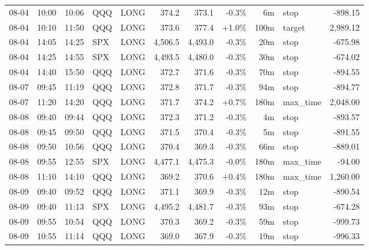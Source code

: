\documentclass[11pt,a4paper,twoside]{article}
\begin{document}
\begin{center}
\begin{longtable}{>{\color{txtmain}}l l l l l r r r r >{\color{txtmain}}l r}
08-04 & 10:00 & 10:06 & QQQ & LONG & 374.2 & 373.1 & \textcolor{lossred}{-0.3\%} & 6m & stop & \textcolor{lossred}{-898.15} \\
08-04 & 10:10 & 11:50 & QQQ & LONG & 373.6 & 377.4 & \textcolor{wingreen}{+1.0\%} & 100m & target & \textcolor{wingreen}{2,989.12} \\
08-04 & 14:05 & 14:25 & SPX & LONG & 4,506.5 & 4,493.0 & \textcolor{lossred}{-0.3\%} & 20m & stop & \textcolor{lossred}{-675.98} \\
08-04 & 14:25 & 14:55 & SPX & LONG & 4,493.5 & 4,480.0 & \textcolor{lossred}{-0.3\%} & 30m & stop & \textcolor{lossred}{-674.02} \\
08-04 & 14:40 & 15:50 & QQQ & LONG & 372.7 & 371.6 & \textcolor{lossred}{-0.3\%} & 70m & stop & \textcolor{lossred}{-894.55} \\
08-07 & 09:45 & 11:19 & QQQ & LONG & 372.8 & 371.7 & \textcolor{lossred}{-0.3\%} & 94m & stop & \textcolor{lossred}{-894.77} \\
08-07 & 11:20 & 14:20 & QQQ & LONG & 371.7 & 374.2 & \textcolor{wingreen}{+0.7\%} & 180m & max\_time & \textcolor{wingreen}{2,048.00} \\
08-08 & 09:40 & 09:44 & QQQ & LONG & 372.3 & 371.2 & \textcolor{lossred}{-0.3\%} & 4m & stop & \textcolor{lossred}{-893.57} \\
08-08 & 09:45 & 09:50 & QQQ & LONG & 371.5 & 370.4 & \textcolor{lossred}{-0.3\%} & 5m & stop & \textcolor{lossred}{-891.55} \\
08-08 & 09:50 & 10:56 & QQQ & LONG & 370.4 & 369.3 & \textcolor{lossred}{-0.3\%} & 66m & stop & \textcolor{lossred}{-889.01} \\
08-08 & 09:55 & 12:55 & SPX & LONG & 4,477.1 & 4,475.3 & \textcolor{lossred}{-0.0\%} & 180m & max\_time & \textcolor{lossred}{-94.00} \\
08-08 & 11:10 & 14:10 & QQQ & LONG & 369.2 & 370.6 & \textcolor{wingreen}{+0.4\%} & 180m & max\_time & \textcolor{wingreen}{1,260.00} \\
08-09 & 09:40 & 09:52 & QQQ & LONG & 371.1 & 369.9 & \textcolor{lossred}{-0.3\%} & 12m & stop & \textcolor{lossred}{-890.54} \\
08-09 & 09:40 & 11:13 & SPX & LONG & 4,495.2 & 4,481.7 & \textcolor{lossred}{-0.3\%} & 93m & stop & \textcolor{lossred}{-674.28} \\
08-09 & 09:55 & 10:54 & QQQ & LONG & 370.3 & 369.2 & \textcolor{lossred}{-0.3\%} & 59m & stop & \textcolor{lossred}{-999.73} \\
08-09 & 10:55 & 11:14 & QQQ & LONG & 369.0 & 367.9 & \textcolor{lossred}{-0.3\%} & 19m & stop & \textcolor{lossred}{-996.33} \\

\end{longtable}
\end{center}
\end{document}
